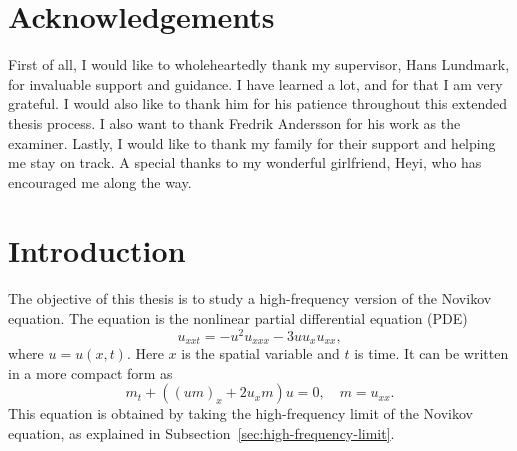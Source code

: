 \documentclass[english,master]{liumaiex}
\theoremstyle{thesisplain}
\theoremstyle{thesisdefinition}
\numberwithin{equation}{section}
\begin{document}
\placeenkeywords

\newpage




\section*{Acknowledgements}

First of all, I would like to wholeheartedly thank my supervisor, Hans Lundmark, for invaluable support and guidance. I have learned a lot, and for that I am very grateful. I would also like to thank him for his patience throughout this extended thesis process.
I also want to thank Fredrik Andersson for his work as the examiner.
Lastly, I would like to thank my family for their support and helping me stay on track. A special thanks to my wonderful girlfriend, Heyi, who has encouraged me along the way.

\newpage


\tableofcontents

\newpage



%
%

\section{Introduction}

The objective of this thesis is to study a high-frequency version of the Novikov equation. The equation is the nonlinear partial differential equation (PDE)
\begin{equation}
	u_{xxt} = -u^2u_{xxx} - 3uu_xu_{xx},
\end{equation}
where $u = u(x, t)$. Here $x$ is the spatial variable and $t$ is time. It can be written in a more compact form as
\begin{equation}
	m_t + ((um)_x + 2u_xm) u = 0,\quad m = u_{xx}.
\end{equation}
This equation is obtained by taking the high-frequency limit of the Novikov equation, as explained in Subsection~\ref{sec:high-frequency-limit}.
\end{document}
